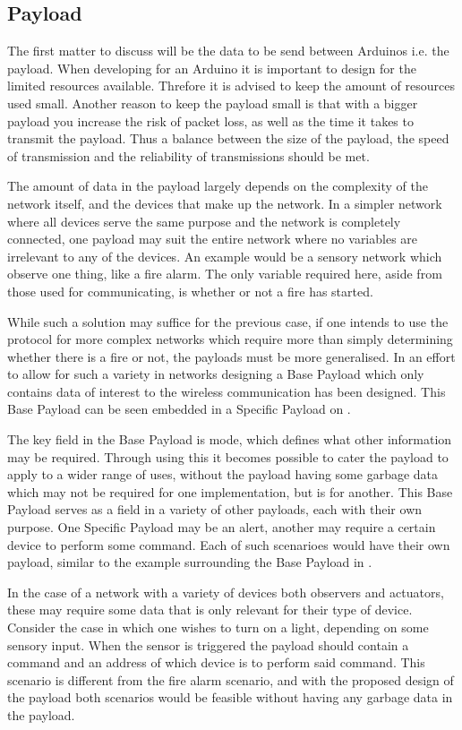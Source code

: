 \subsection{Payload}
The first matter to discuss will be the data to be send between Arduinos i.e. the payload.
When developing for an Arduino it is important to design for the limited resources available.
Threfore it is advised to keep the amount of resources used small.
Another reason to keep the payload small is that with a bigger payload you increase the risk of packet loss, as well as the time it takes to transmit the payload.
Thus a balance between the size of the payload, the speed of transmission and the reliability of transmissions should be met.

\bigskip 
The amount of data in the payload largely depends on the complexity of the network itself, and the devices that make up the network.
In a simpler network where all devices serve the same purpose and the network is completely connected, one payload may suit the entire network where no variables are irrelevant to any of the devices.
An example would be a sensory network which observe one thing, like a fire alarm.
The only variable required here, aside from those used for communicating, is whether or not a fire has started.

While such a solution may suffice for the previous case, if one intends to use the protocol for more complex networks which require more than simply determining whether there is a fire or not, the payloads must be more generalised.
In an effort to allow for such a variety in networks designing a Base Payload which only contains data of interest to the wireless communication has been designed.
This Base Payload can be seen embedded in a Specific Payload on .

\bigskip \noindent
The key field in the Base Payload is mode, which defines what other information may be required.
Through using this it becomes possible to cater the payload to apply to a wider range of uses, without the payload having some garbage data which may not be required for one implementation, but is for another.
This Base Payload serves as a field in a variety of other payloads, each with their own purpose.
One Specific Payload may be an alert, another may require a certain device to perform some command.
Each of such scenarioes would have their own payload, similar to the example surrounding the Base Payload in .

\bigskip
In the case of a network with a variety of devices both observers and actuators, these may require some data that is only relevant for their type of device.
Consider the case in which one wishes to turn on a light, depending on some sensory input.
When the sensor is triggered the payload should contain a command and an address of which device is to perform said command.
This scenario is different from the fire alarm scenario, and with the proposed design of the payload both scenarios would be feasible without having any garbage data in the payload.

